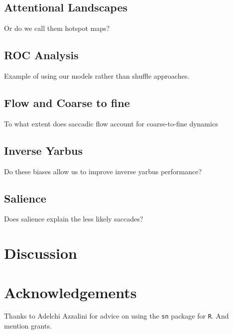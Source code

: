 \documentclass[a4paper, onecolumn, oneside, 11pt]{article}
\begin{document}
\subsection{Attentional Landscapes}

Or do we call them hotspot maps?

\subsection{ROC Analysis}

Example of using our models rather than shuffle approaches.

\subsection{Flow and Coarse to fine}
To what extent does saccadic flow account for coarse-to-fine dynamics

\subsection{Inverse Yarbus}

Do these biases allow us to improve inverse yarbus performance?

\subsection{Salience}

Does salience explain the less likely saccades? 

\section{Discussion}

\section*{Acknowledgements}

Thanks to Adelchi Azzalini for advice on using the \texttt{sn} package for \texttt{R}. And mention grants. 


\small

\end{document}
